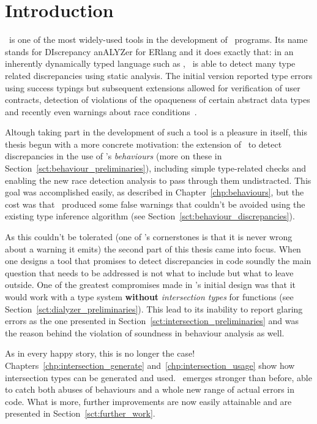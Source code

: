 \chapter{Introduction}

\dr\ is one of the most widely-used tools in the development of
\er\ programs. Its name stands for DIscrepancy anALYZer for ERlang and
it does exactly that: in an inherently dynamically typed language such
as \er, \dr\ is able to detect many type related discrepancies using
static analysis. The initial version reported type errors using
success typings but subsequent extensions allowed for verification of
user contracts, detection of violations of the opaqueness of certain
abstract data types and recently even warnings about race
conditions~\cite{Races@PADL-10,
  springerlink:10.1007/978-3-540-30477-7_7, SuccessTypings@PPDP-06,
  opaques}.

Altough taking part in the development of such a tool is a pleasure in
itself, this thesis begun with a more concrete motivation: the
extension of \dr\ to detect discrepancies in the use of \er's
\emph{behaviours} (more on these in
Section~\ref{sct:behaviour_preliminaries}), including simple
type-related checks and enabling the new race detection analysis to
pass through them undistracted. This goal was accomplished easily, as
described in Chapter~\ref{chp:behaviours}, but the cost was that
\dr\ produced some false warnings that couldn't be avoided using the
existing type inference algorithm (see
Section~\ref{sct:behaviour_discrepancies}).

As this couldn't be tolerated (one of \dr's cornerstones is that it is
never wrong about a warning it emits) the second part of this thesis
came into focus. When one designs a tool that promises to detect
discrepancies in code soundly the main question that needs to be
addressed is not what to include but what to leave outside. One of the
greatest compromises made in \dr's initial design was that it would
work with a type system \textbf{without} \emph{intersection types} for
functions (see Section~\ref{sct:dialyzer_preliminaries}). This lead to
its inability to report glaring errors as the one presented in
Section~\ref{sct:intersection_preliminaries} and was the reason behind
the violation of soundness in behaviour analysis as well.

As in every happy story, this is no longer the case!
Chapters~\ref{chp:intersection_generate}
and~\ref{chp:intersection_usage} show how intersection types can be
generated and used. \dr\ emerges stronger than before, able to catch
both abuses of behaviours and a whole new range of actual errors in
code. What is more, further improvements are now easily attainable and
are presented in Section~\ref{sct:further_work}.

